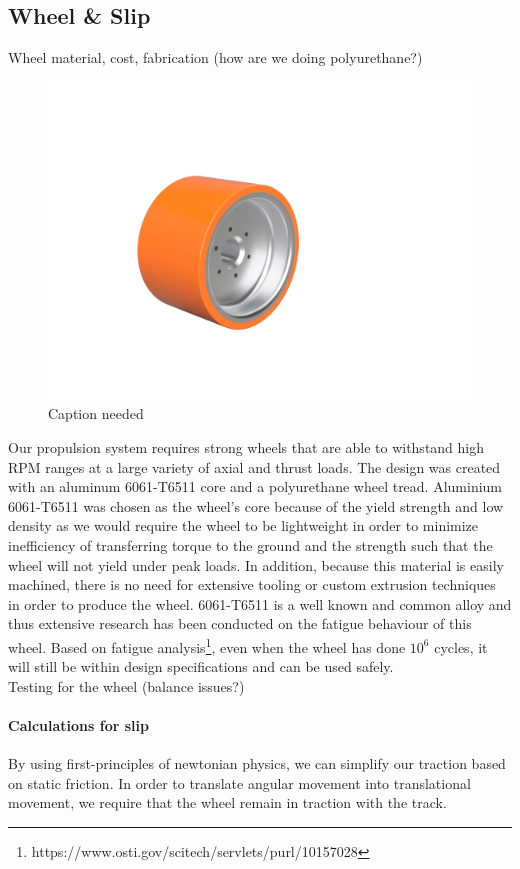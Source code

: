 \documentclass[main.tex]{subfile}
\begin{document}
    \subsection{Wheel \& Slip}
    Wheel material, cost, fabrication (how are we doing polyurethane?)
    \begin{figure}[H]
        \centering
        \includegraphics[width=\linewidth]{images/fig19}
        \caption{Caption needed}
    \end{figure}
    Our propulsion system requires strong wheels that are able to withstand high RPM ranges at a large variety of axial and thrust loads. The design was created with an aluminum 6061-T6511 core and a polyurethane wheel tread. Aluminium 6061-T6511 was chosen as the wheel’s core because of the yield strength and low density as we would require the wheel to be lightweight in order to minimize inefficiency of transferring torque to the ground and the strength such that the wheel will not yield under peak loads. In addition, because this material is easily machined, there is no need for extensive tooling or custom extrusion techniques in order to produce the wheel. 6061-T6511 is a well known and common alloy and thus extensive research has been conducted on the fatigue behaviour of this wheel. Based on fatigue analysis\footnote{ https://www.osti.gov/scitech/servlets/purl/10157028}, even when the wheel has done $10^6$ cycles, it will still be within design specifications and can be used safely.\\

    Testing for the wheel (balance issues?)

    \paragraph{Calculations for slip}
    By using first-principles of newtonian physics, we can simplify our traction based on static friction. In order to translate angular movement into translational movement, we require that the wheel remain in traction with the track.\\
\end{document}
